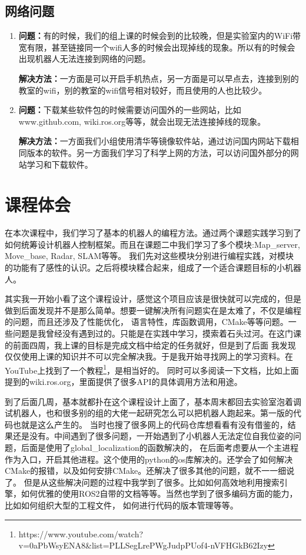 \documentclass[a4paper,twoside]{article}
\begin{document}
\subsection{网络问题}
\begin{enumerate}
	\item \textbf{问题：}有的时候，我们的组上课的时候会到的比较晚，但是实验室内的WiFi带宽有限，甚至链接同一个wifi人多的时候会出现掉线的现象。所以有的时候会出现机器人无法连接到网络的问题。

	      \textbf{解决方法：}一方面是可以开启手机热点，另一方面是可以早点去，连接到别的教室的wifi，别的教室的wifi信号相对较好，而且使用的人也比较少。
	\item \textbf{问题：}下载某些软件包的时候需要访问国外的一些网站，比如www.github.com, wiki.ros.org等等，就会出现无法连接掉线的现象。

	      \textbf{解决方法：}一方面我们小组使用清华等镜像软件站，通过访问国内网站下载相同版本的软件。另一方面我们学习了科学上网的方法，可以访问国外部分的网站学习和下载软件。
\end{enumerate}

\newpage
\section{课程体会}
在本次课程中，我们学习了基本的机器人的编程方法。通过两个课题实践学习到了如何统筹设计机器人控制框架。而且在课题二中我们学习了多个模块:Map\_server, Move\_base, Radar, SLAM等等。
我们先对这些模块分别进行编程实践，对模块的功能有了感性的认识。之后将模块糅合起来，组成了一个适合课题目标的小机器人。

其实我一开始小看了这个课程设计，感觉这个项目应该是很快就可以完成的，但是做到后面发现并不是那么简单。想要一键解决所有问题实在是太难了，不仅是编程的问题，而且还涉及了性能优化，
语言特性，库函数调用，CMake等等问题。一些问题是我曾经没有遇到过的。只能是在实践中学习，摸索着石头过河。在这门课的前面四周，我上课的目标是完成文档中给定的任务就好，但是到了后面
我发现仅仅使用上课的知识并不可以完全解决我。于是我开始寻找网上的学习资料。在YouTube上找到了一个教程\footnote{https://www.youtube.com/watch?v=0aPbWsyENA8\&list=PLLSegLrePWgJudpPUof4-nVFHGkB62Izy}，是相当好的。
同时可以多阅读一下文档，比如上面提到的wiki.ros.org，里面提供了很多API的具体调用方法和用途。

到了后面几周，基本就都扑在这个课程设计上面了，基本周末都回去实验室泡着调试机器人，也和很多别的组的大佬一起研究怎么可以把机器人跑起来。第一版的代码也就是这么产生的。
当时也搜了很多网上的代码仓库想看看有没有借鉴的，结果还是没有。中间遇到了很多问题，一开始遇到了小机器人无法定位自我位姿的问题，后面是使用了global\_localization的函数解决的，
在后面考虑要从一个主进程作为入口，开启其他进程。这个使用的python的os库解决的。还学会了如何解决CMake的报错，以及如何安排CMake。还解决了很多其他的问题，就不一一细说了。
但是从这些解决问题的过程中我学到了很多。比如如何高效地利用搜索引擎，如何优雅的使用ROS2自带的文档等等。当然也学到了很多编码方面的能力，比如如何组织大型的工程文件，
如何进行代码的版本管理等等。
\end{document}
